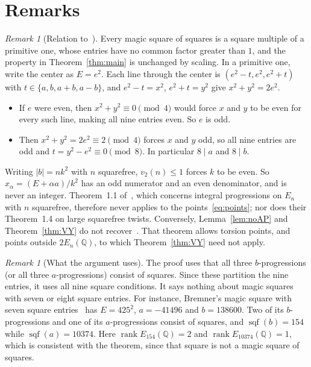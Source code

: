\documentclass[11pt]{amsart}
\theoremstyle{definition}
\theoremstyle{remark}
\newtheorem{remark}[theorem]{Remark}
\newcommand{\Q}{\mathbb{Q}}
\DeclareMathOperator{\sqf}{sqf}
\DeclareMathOperator{\rk}{rank}
\begin{document}
\section{Remarks}

\begin{remark}[Relation to~\cite{BST}]\label{rem:BST}
Every magic square of squares is a square multiple of a primitive one, whose entries have no common factor
greater than $1$, and the property in Theorem~\ref{thm:main} is unchanged by scaling. In a primitive one,
write the center as $E=e^2$. Each line through the center is $(e^2-t,e^2,e^2+t)$ with
$t\in\{a,b,a+b,a-b\}$, and $e^2-t=x^2$, $e^2+t=y^2$ give $x^2+y^2=2e^2$.
\begin{itemize}
\item If $e$ were even, then $x^2+y^2\equiv0\pmod4$ would force $x$ and $y$ to be even for every such
line, making all nine entries even. So $e$ is odd.
\item Then $x^2+y^2=2e^2\equiv2\pmod4$ forces $x$ and $y$ odd, so all nine entries are odd and
$t=y^2-e^2\equiv0\pmod8$. In particular $8\mid a$ and $8\mid b$.
\end{itemize}
Writing $|b|=nk^2$ with $n$ squarefree, $v_2(n)\le1$ forces $k$ to be even. So
$x_\alpha=(E+\alpha a)/k^2$ has an odd numerator and an even denominator, and is never an integer.
Theorem~1.1 of~\cite{BST}, which concerns integral progressions on $E_n$ with $n$ squarefree, therefore
never applies to the points~\eqref{eq:points}; nor does their Theorem~1.4 on large squarefree twists.
Conversely, Lemma~\ref{lem:noAP} and Theorem~\ref{thm:VY} do not recover~\cite[Thm.~1.1]{BST}. That
theorem allows torsion points, and points outside $2E_n(\Q)$, to which Theorem~\ref{thm:VY} need not
apply.
\end{remark}

\begin{remark}[What the argument uses]\label{rem:uses}
The proof uses that all three $b$-progressions (or all three $a$-progressions) consist of squares. Since
these partition the nine entries, it uses all nine square conditions. It says nothing about magic squares
with seven or eight square entries. For instance, Bremner's magic square with seven square
entries~\cite{Bremner99} has $E=425^2$, $a=-41496$ and $b=138600$. Two of its $b$-progressions and one of
its $a$-progressions consist of squares, and $\sqf(b)=154$ while $\sqf(a)=10374$. Here $\rk E_{154}(\Q)=2$
and $\rk E_{10374}(\Q)=1$, which is consistent with the theorem, since that square is not a magic square
of squares.
\end{remark}
\end{document}
